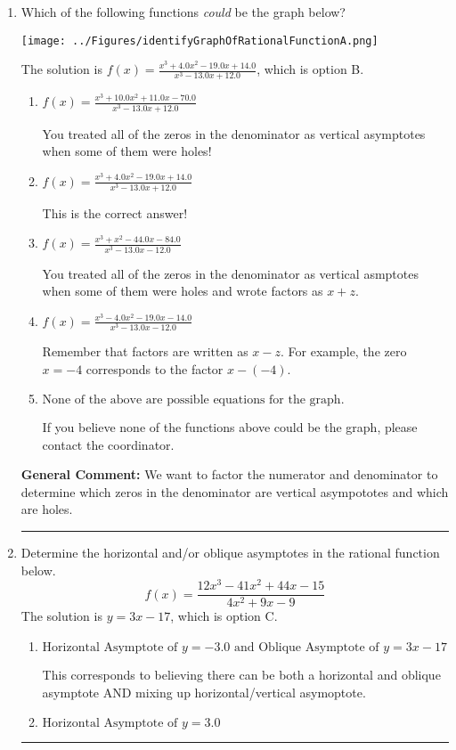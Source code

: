 \documentclass{extbook}[14pt]
\newcommand{\litem}[1]{\item #1

\rule{\textwidth}{0.4pt}}
\begin{document}
\begin{enumerate}\litem{
Which of the following functions \textit{could} be the graph below?

\begin{center}
    \texttt{[image: ../Figures/identifyGraphOfRationalFunctionA.png]}
\end{center}


The solution is \( f(x)=\frac{x^{3} +4.0 x^{2} -19.0 x + 14.0}{x^{3} -13.0 x + 12.0} \), which is option B.\begin{enumerate}[label=\Alph*.]
\item \( f(x)=\frac{x^{3} +10.0 x^{2} +11.0 x -70.0}{x^{3} -13.0 x + 12.0} \)

You treated all of the zeros in the denominator as vertical asymptotes when some of them were holes!
\item \( f(x)=\frac{x^{3} +4.0 x^{2} -19.0 x + 14.0}{x^{3} -13.0 x + 12.0} \)

This is the correct answer!
\item \( f(x)=\frac{x^{3} + x^{2} -44.0 x -84.0}{x^{3} -13.0 x -12.0} \)

You treated all of the zeros in the denominator as vertical asmptotes when some of them were holes and wrote factors as $x+z$.
\item \( f(x)=\frac{x^{3} -4.0 x^{2} -19.0 x -14.0}{x^{3} -13.0 x -12.0} \)

Remember that factors are written as $x-z$. For example, the zero $x=-4$ corresponds to the factor $x-(-4)$.
\item \( \text{None of the above are possible equations for the graph.} \)

If you believe none of the functions above could be the graph, please contact the coordinator.
\end{enumerate}

\textbf{General Comment:} We want to factor the numerator and denominator to determine which zeros in the denominator are vertical asympototes and which are holes.
}
\litem{
Determine the horizontal and/or oblique asymptotes in the rational function below.
\[ f(x) = \frac{12x^{3} -41 x^{2} +44 x -15}{4x^{2} +9 x -9} \]The solution is \( y = 3x -17 \), which is option C.\begin{enumerate}[label=\Alph*.]
\item \( \text{Horizontal Asymptote of } y = -3.0 \text{ and Oblique Asymptote of } y = 3x -17 \)

This corresponds to believing there can be both a horizontal and oblique asymptote AND mixing up horizontal/vertical asymoptote.
\item \( \text{Horizontal Asymptote of } y = 3.0  \)


\end{enumerate}}
\end{enumerate}
\end{document}
